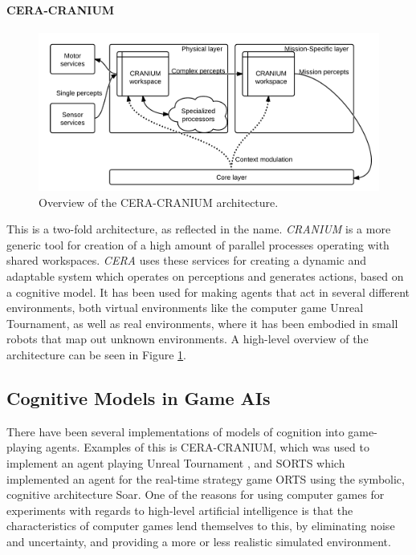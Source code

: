 \paragraph{CERA-CRANIUM}
\begin{figure}[h!tb]
\centering
\includegraphics[width=0.75\textheight]{graphics/ceracranium.png}
\caption{Overview of the CERA-CRANIUM architecture.}
\label{fig:cera-cranium}
\end{figure}
This is a two-fold architecture, as reflected in the name. {\em CRANIUM} is a more generic tool for creation of a high amount of parallel processes operating with shared workspaces. {\em CERA} uses these services for creating a dynamic and adaptable system which operates on perceptions and generates actions, based on a cognitive model.\cite{arrabales2009gamechars} It has been used for making agents that act in several different environments, both virtual environments like the computer game Unreal Tournament, as well as real environments, where it has been embodied in small robots that map out unknown environments. \cite{arrabales2009ceracranium} A high-level overview of the architecture can be seen in Figure \ref{fig:cera-cranium}.

\subsection{Cognitive Models in Game AIs}
There have been several implementations of models of cognition into game-playing agents. Examples of this is CERA-CRANIUM, which was used to implement an agent playing Unreal Tournament \cite{arrabales2009ceracranium}, and SORTS which implemented an agent for the real-time strategy game ORTS using the symbolic, cognitive architecture Soar.\cite{wintermute2007sorts} One of the reasons for using computer games for experiments with regards to high-level artificial intelligence is that the characteristics of computer games lend themselves to this, by eliminating noise and uncertainty, and providing a more or less realistic simulated environment.
